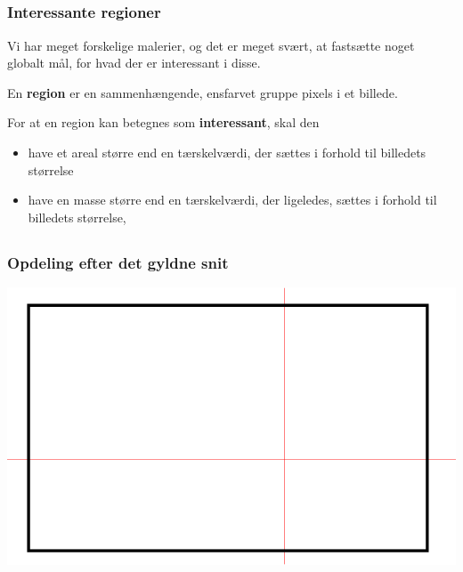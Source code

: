 \documentclass[xcolor=table]{beamer}
\begin{document}
\subsection*{}
\begin{frame}

    \frametitle{Interessante regioner}

    Vi har meget forskelige malerier, og det er meget svært, at fastsætte noget globalt mål, for
    hvad der er interessant i disse.

    \begin{definition}
        En \textbf{region} er en sammenhængende, ensfarvet gruppe pixels i
        et billede.
    \end{definition}

    \begin{definition}
        For at en region kan betegnes som \textbf{interessant}, skal den
        \begin{itemize}
            \item have et areal større end en tærskelværdi, der sættes i
                forhold til billedets størrelse
            \item have en masse større end en tærskelværdi, der ligeledes,
                sættes i forhold til billedets størrelse,
        \end{itemize}
    \end{definition}

\end{frame}

\subsection*{}
\begin{frame}

    \frametitle{Opdeling efter det gyldne snit}

    \includegraphics[width=\textwidth]{billeder/scan_direction}

\end{frame}
\end{document}
